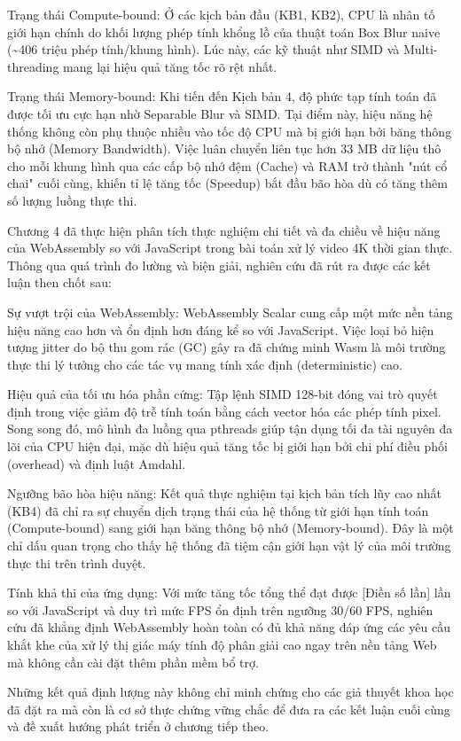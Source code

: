 Trạng thái Compute-bound: Ở các kịch bản đầu (KB1, KB2), CPU là nhân tố giới hạn chính do khối lượng phép tính khổng lồ của thuật toán Box Blur naive (\textasciitilde{}406 triệu phép tính/khung hình). Lúc này, các kỹ thuật như SIMD và Multi-threading mang lại hiệu quả tăng tốc rõ rệt nhất.


Trạng thái Memory-bound: Khi tiến đến Kịch bản 4, độ phức tạp tính toán đã được tối ưu cực hạn nhờ Separable Blur và SIMD. Tại điểm này, hiệu năng hệ thống không còn phụ thuộc nhiều vào tốc độ CPU mà bị giới hạn bởi băng thông bộ nhớ (Memory Bandwidth). Việc luân chuyển liên tục hơn 33 MB dữ liệu thô cho mỗi khung hình qua các cấp bộ nhớ đệm (Cache) và RAM trở thành "nút cổ chai" cuối cùng, khiến tỉ lệ tăng tốc (Speedup) bắt đầu bão hòa dù có tăng thêm số lượng luồng thực thi.



Chương 4 đã thực hiện phân tích thực nghiệm chi tiết và đa chiều về hiệu năng của WebAssembly so với JavaScript trong bài toán xử lý video 4K thời gian thực. Thông qua quá trình đo lường và biện giải, nghiên cứu đã rút ra được các kết luận then chốt sau:


Sự vượt trội của WebAssembly: WebAssembly Scalar cung cấp một mức nền tảng hiệu năng cao hơn và ổn định hơn đáng kể so với JavaScript. Việc loại bỏ hiện tượng jitter do bộ thu gom rác (GC) gây ra đã chứng minh Wasm là môi trường thực thi lý tưởng cho các tác vụ mang tính xác định (deterministic) cao.


Hiệu quả của tối ưu hóa phần cứng: Tập lệnh SIMD 128-bit đóng vai trò quyết định trong việc giảm độ trễ tính toán bằng cách vector hóa các phép tính pixel. Song song đó, mô hình đa luồng qua pthreads giúp tận dụng tối đa tài nguyên đa lõi của CPU hiện đại, mặc dù hiệu quả tăng tốc bị giới hạn bởi chi phí điều phối (overhead) và định luật Amdahl.


Ngưỡng bão hòa hiệu năng: Kết quả thực nghiệm tại kịch bản tích lũy cao nhất (KB4) đã chỉ ra sự chuyển dịch trạng thái của hệ thống từ giới hạn tính toán (Compute-bound) sang giới hạn băng thông bộ nhớ (Memory-bound). Đây là một chỉ dấu quan trọng cho thấy hệ thống đã tiệm cận giới hạn vật lý của môi trường thực thi trên trình duyệt.


Tính khả thi của ứng dụng: Với mức tăng tốc tổng thể đạt được [Điền số lần] lần so với JavaScript và duy trì mức FPS ổn định trên ngưỡng 30/60 FPS, nghiên cứu đã khẳng định WebAssembly hoàn toàn có đủ khả năng đáp ứng các yêu cầu khắt khe của xử lý thị giác máy tính độ phân giải cao ngay trên nền tảng Web mà không cần cài đặt thêm phần mềm bổ trợ.


Những kết quả định lượng này không chỉ minh chứng cho các giả thuyết khoa học đã đặt ra mà còn là cơ sở thực chứng vững chắc để đưa ra các kết luận cuối cùng và đề xuất hướng phát triển ở chương tiếp theo.
